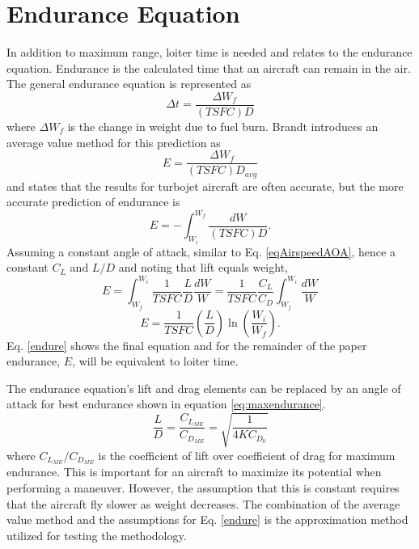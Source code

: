 \section{Endurance Equation}
In addition to maximum range, loiter time is needed and relates to the endurance equation. Endurance is the calculated time that an aircraft can remain in the air. The general endurance equation is represented as
\begin{equation}
    \Delta t = \dfrac{\Delta W_f}{(TSFC)D}
\end{equation}
where $\Delta W_f$ is the change in weight due to fuel burn. Brandt \cite{IntrotoAero} introduces an average value method for this prediction as
\begin{equation}
    E = \dfrac{\Delta W_f}{(TSFC)D_{avg}}
\end{equation}
and states that the results for turbojet aircraft are often accurate, but the more accurate prediction of endurance is
\begin{equation}
    E = -\int_{W_i}^{W_f}\dfrac{dW}{(TSFC)D}.
\end{equation}
Assuming a constant angle of attack, similar to Eq. \ref{eqAirspeedAOA}, hence a constant $C_L$ and $L/D$ and noting that lift equals weight,
\begin{equation*}
    E = \int_{W_f}^{W_i}\dfrac{1}{TSFC}\dfrac{L}{D}\dfrac{dW}{W} = \dfrac{1}{TSFC}\dfrac{C_L}{C_D}\int_{W_f}^{W_i}\dfrac{dW}{W}
\end{equation*}
\begin{equation}
\label{endure}
    E = \dfrac{1}{TSFC}\left(\dfrac{L}{D}\right) \ln\left(\dfrac{W_i}{W_f}\right).
\end{equation}
Eq. \ref{endure} shows the final equation and for the remainder of the paper endurance, $E$, will be equivalent to loiter time.\par
The endurance equation's lift and drag elements can be replaced by an angle of attack for best endurance \cite{OptimizeBreguet} shown in equation \ref{eq:maxendurance}.
\begin{equation}
\label{eq:maxendurance}
\dfrac{L}{D} = \dfrac{C_{L_{ME}}}{C_{D_{ME}}} = \sqrt{\dfrac{1}{4KC_{D_0}}}
\end{equation}
where $C_{L_{ME}}/C_{D_{ME}}$ is the coefficient of lift over coefficient of drag for maximum endurance. This is important for an aircraft to maximize its potential when performing a maneuver. However, the assumption that this is constant requires that the aircraft fly slower as weight decreases. The combination of the average value method and the assumptions for Eq. \ref{endure} is the approximation method utilized for testing the methodology.
